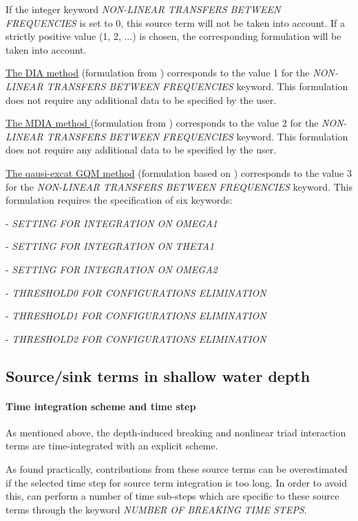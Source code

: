  If the integer keyword \textit{NON-LINEAR TRANSFERS BETWEEN FREQUENCIES} is set to 0, this source term will not be taken into account. If a strictly positive value (1, 2, ...) is chosen, the corresponding formulation will be taken into account.

 \underline{  The DIA method} (formulation from \cite{Hasselmann1985_1}) corresponds to the value 1 for the \textit{NON-LINEAR TRANSFERS BETWEEN FREQUENCIES} keyword. This formulation does not require any additional data to be specified by the user.

 \underline{The MDIA method }(formulation from \cite{Tolman2004}) corresponds to the value 2 for the \textit{NON-LINEAR TRANSFERS BETWEEN FREQUENCIES} keyword. This formulation does not require any additional data to be specified by the user.

 \underline{The qausi-excat GQM method} (formulation based on \cite{Lavrenov2001}) corresponds to the value 3 for the \textit{NON-LINEAR TRANSFERS BETWEEN FREQUENCIES} keyword. This formulation requires the specification of six keywords:

- \textit{SETTING FOR INTEGRATION ON OMEGA1}

- \textit{SETTING FOR INTEGRATION ON THETA1}

- \textit{SETTING FOR INTEGRATION ON OMEGA2}

- \textit{THRESHOLD0 FOR CONFIGURATIONS ELIMINATION}

- \textit{THRESHOLD1 FOR CONFIGURATIONS ELIMINATION}

- \textit{THRESHOLD2 FOR CONFIGURATIONS ELIMINATION}


\subsection{ Source/sink terms in shallow water depth}
\label{se:sourcshallow}

\paragraph{ Time integration scheme and time step}

 As mentioned above, the depth-induced breaking and nonlinear triad interaction terms are time-integrated with an explicit scheme.

 As found practically, contributions from these source terms can be overestimated if the selected time step for source term integration is too long. In order to avoid this, \tomawac can perform a number of time sub-steps which are specific to these source terms through the keyword \textit{NUMBER OF BREAKING TIME STEPS}.


